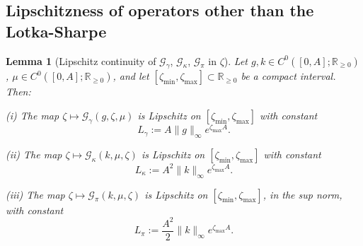 \documentclass[journal,twoside,web]{ieeecolor}
\newtheorem{lemma}{Lemma}
\begin{document}

\subsection{Lipschitzness of operators other than the Lotka-Sharpe}
\label{app-Lip-other}

\begin{lemma}[Lipschitz continuity of $\mathcal{G}_\gamma$, $\mathcal{G}_\kappa$, $\mathcal{G}_\pi$ in $\zeta$]
\label{lem-Lip-other}
Let $g, k \in C^0([0,A];\mathbb{R}_{\geq 0})$, $\mu \in C^0([0,A];\mathbb{R}_{\geq 0})$, and let $[\zeta_{\min},\zeta_{\max}] \subset \mathbb{R}_{\geq 0}$ be a compact interval. Then:

\smallskip
\noindent\textit{(i)} The map $\zeta \mapsto \mathcal{G}_\gamma(g,\zeta,\mu)$ is Lipschitz on $[\zeta_{\min},\zeta_{\max}]$ with constant
\begin{equation}
L_\gamma := A\|g\|_\infty e^{\zeta_{\max} A}.
\end{equation}

\noindent\textit{(ii)} The map $\zeta \mapsto \mathcal{G}_\kappa(k,\mu,\zeta)$ is Lipschitz on $[\zeta_{\min},\zeta_{\max}]$ with constant
\begin{equation}
L_\kappa := A^2\|k\|_\infty e^{\zeta_{\max} A}.
\end{equation}

\noindent\textit{(iii)} The map $\zeta \mapsto \mathcal{G}_\pi(k,\mu,\zeta)$ is Lipschitz on $[\zeta_{\min},\zeta_{\max}]$, in the sup norm, with constant
\begin{equation}
L_\pi := \frac{A^2}{2}\|k\|_\infty e^{\zeta_{\max} A}.
\end{equation}
\end{lemma}
\end{document}
